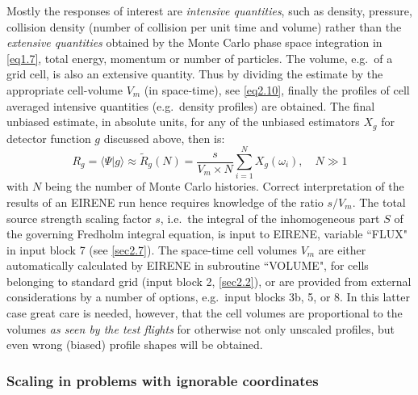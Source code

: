 Mostly the responses of interest are \emph{intensive quantities}, such as
density, pressure, collision density (number of collision per unit time and
volume) rather than the \emph{extensive quantities} obtained by the Monte Carlo
phase space integration in \cref{eq1.7}, total energy, momentum or number of
particles.
The volume, e.g.\ of a grid cell, is also an extensive quantity.
Thus by dividing the estimate by the appropriate cell-volume $V_m$ (in
space-time), see \cref{eq2.10}, finally the profiles of cell averaged intensive
quantities (e.g.\ density profiles) are obtained.
The final unbiased estimate, in absolute units, for any of the unbiased
estimators $X_g$ for detector function $g$ discussed above, then is:
\begin{equation}
  \label{eq1.8b}
  R_g =\langle\Psi|g\rangle \approx   \tilde{R}_g(N) = \frac{s}{V_m\times N}
  \sum_{i=1}^{N}	      X_g( \omega_i), \quad N \gg 1
\end{equation}
with $N$
being the number of Monte Carlo histories.
Correct interpretation of the results of an EIRENE run hence requires knowledge
of the ratio $s/V_m$.
The total source strength scaling factor $s$, i.e.\ the integral of the
inhomogeneous part $S$ of the governing Fredholm integral equation, is input to
EIRENE, variable ``FLUX" in input block 7 (see \cref{sec2.7}).
The space-time cell volumes $V_m$ are either automatically calculated by EIRENE
in subroutine ``VOLUME", for cells belonging to standard grid (input block 2,
\cref{sec2.2}), or are provided from external considerations by a number of
options, e.g.\ input blocks 3b, 5, or 8.
In this latter case great care is needed, however, that the cell volumes are
proportional to the volumes \emph{as seen by the test flights} for otherwise
not only unscaled profiles, but even wrong (biased) profile shapes will be
obtained.

\subsubsection{Scaling in problems with ignorable coordinates}\label{sec1.2.0a}

